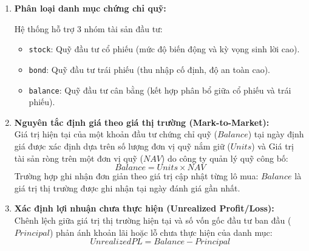 \documentclass[11pt,a4paper]{article}
\providecommand{\tightlist}{
  \setlength{\itemsep}{0pt}\setlength{\parskip}{0pt}}
\begin{document}
\begin{enumerate}
\def\labelenumi{\arabic{enumi}.}
\item
  \textbf{Phân loại danh mục chứng chỉ quỹ:}\\
  \begin{center}
  \end{center}
  Hệ thống hỗ trợ 3 nhóm tài sản đầu tư:

  \begin{itemize}
  \tightlist
  \item
    \texttt{stock}: Quỹ đầu tư cổ phiếu (mức độ biến động và kỳ vọng
    sinh lời cao).
  \item
    \texttt{bond}: Quỹ đầu tư trái phiếu (thu nhập cố định, độ an toàn
    cao).
  \item
    \texttt{balance}: Quỹ đầu tư cân bằng (kết hợp phân bổ giữa cổ phiếu
    và trái phiếu).
  \end{itemize}
\item
  \textbf{Nguyên tắc định giá theo giá thị trường (Mark-to-Market):}\\
  Giá trị hiện tại của một khoản đầu tư chứng chỉ quỹ (\(Balance\)) tại
  ngày định giá được xác định dựa trên số lượng đơn vị quỹ nắm giữ
  (\(Units\)) và Giá trị tài sản ròng trên một đơn vị quỹ (\(NAV\)) do
  công ty quản lý quỹ công bố: \[Balance = Units \times NAV\] Trường hợp
  ghi nhận đơn giản theo giá trị cập nhật từng lô mua: \(Balance\) là
  giá trị thị trường được ghi nhận tại ngày đánh giá gần nhất.
\item
  \textbf{Xác định lợi nhuận chưa thực hiện (Unrealized Profit/Loss):}\\
  Chênh lệch giữa giá trị thị trường hiện tại và số vốn gốc đầu tư ban
  đầu (\(Principal\)) phản ánh khoản lãi hoặc lỗ chưa thực hiện của danh
  mục: \[UnrealizedPL = Balance - Principal\]


\end{enumerate}
\end{document}
